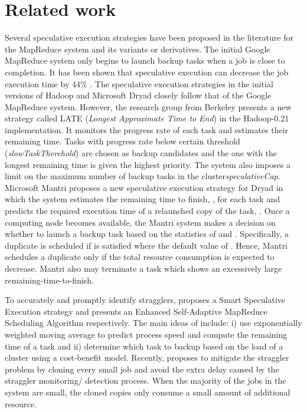 \documentclass[10pt,conference]{IEEEtran}
\begin{document}
\section{Related work}
\label{related_work}
Several speculative execution strategies have been proposed in the literature for the MapReduce system and its variants or derivatives. The initial Google MapReduce system only begins to launch backup tasks  when a job is close to completion. It has been shown that speculative execution can decrease the job execution time by 44\% {\cite{mapreduce:google}}.
The speculative execution strategies in the initial versions of  Hadoop {\cite{hadoop}} and Microsoft Dryad {\cite{Dryad}} closely follow that of the Google MapReduce system. However, the research group from Berkeley presents a new strategy called LATE (\emph{Longest Approximate Time to End}) {\cite{Performance}} in the Hadoop-0.21 implementation. It monitors the progress rate of each task and estimates their remaining time. Tasks with progress rate below certain threshold (\textit{slowTaskTherehold}) are chosen as backup candidates and the one with the longest remaining time is given the highest priority.  The system also imposes a limit on the maximum  number of backup tasks in the cluster\textit{speculativeCap}. Microsoft Mantri {\cite{Outliers}} proposes a new speculative execution strategy for Dryad in which the system estimates  the remaining time to finish, , for each task and predicts the required execution time of a relaunched copy of the task, . Once a computing node becomes available, the Mantri system makes a decision on whether to launch a backup task based on the statistics of  and . Specifically, a duplicate is scheduled if  is satisfied where
 the default value of . Hence, Mantri schedules a duplicate only if the total resource consumption is expected to decrease. Mantri also may terminate a task which shows an excessively large remaining-time-to-finish.

To accurately and promptly identify stragglers, {\cite{Smart_Speculative}} proposes a Smart Speculative Execution strategy and {\cite{ESAMR}} presents an Enhanced Self-Adaptive MapReduce Scheduling Algorithm respectively. The main ideas of {\cite{Smart_Speculative}} include: i) use exponentially weighted moving average to predict process speed and compute the remaining time of a task and  ii) determine which task to backup based on the load of a cluster using a cost-benefit model. Recently, {\cite{Cloning}} proposes  to mitigate the straggler problem by cloning every small job and avoid the extra delay caused by the straggler monitoring/ detection process.
When the majority of the jobs in the system are small, the cloned copies only consume a small amount of additional resource.
\end{document}
